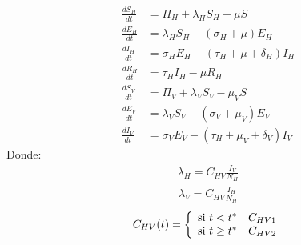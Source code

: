 	\begin{align}
		\frac{dS_H}{dt} &= \Pi_H + \lambda_H S_H - \mu S \\
		\frac{dE_H}{dt} &= \lambda_H S_H - (\sigma_H + \mu)E_H \\
		\frac{dI_H}{dt} &= \sigma_H E_H - (\tau_H + \mu + \delta_H)I_H \\
		\frac{dR_H}{dt} &= \tau_H I_H - \mu R_H \\	
		\frac{dS_V}{dt} &= \Pi_V + \lambda_V S_V - \mu_V S \\
		\frac{dE_V}{dt} &= \lambda_V S_V - (\sigma_V + \mu_V)E_V \\
		\frac{dI_V}{dt} &= \sigma_V E_V - (\tau_H + \mu_V + \delta_V)I_V 
	\end{align}
		Donde:
	\begin{align}
		\lambda_H = C_{HV}\frac{I_V}{N_H}
	\end{align}
	\begin{align}	
		\lambda_V = C_{HV}\frac{I_H}{N_H}
	\end{align}
	\begin{align}
		C_{HV} (t) = \left\lbrace
		\begin{array}{ll}
		\textup{si } t<t^* & C_{HV1} \\
		\textup{si } t\geq t^* & C_{HV2} 
		\end{array}
		\right.
	\end{align}
	\bigskip
